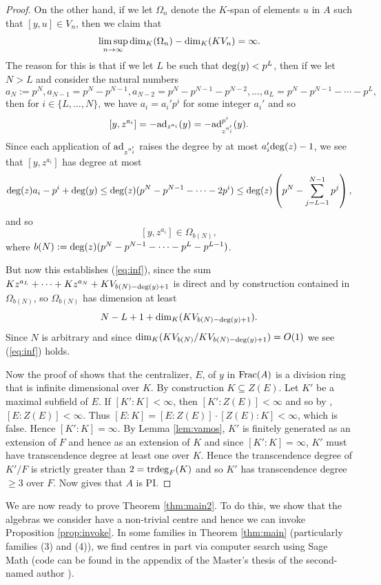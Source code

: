\documentclass[a4paper,11pt,twoside,notitlepage,reqno]{amsart}
\theoremstyle{plain}
\numberwithin{thm}{section}
\theoremstyle{definition}
\begin{document}
\begin{proof}
On the other hand, if we let $\Omega_n$ denote the $K$-span of elements $u$ in $A$ such that $[y,u]\in V_n$, then we claim that 
\begin{equation}
\limsup_{n\to \infty} {\rm dim}_K(\Omega_n) - {\rm dim}_K(KV_n) =\infty.\label{eq:inf}\end{equation}
The reason for this is that if we let $L$ be such that ${\rm deg}(y)<p^L$, then if we let $N>L$ and consider the natural numbers
$$a_N:=p^N, a_{N-1}= p^N-p^{N-1}, a_{N-2} = p^N-p^{N-1}-p^{N-2}, \ldots , a_L=p^N-p^{N-1}-\cdots - p^L,$$ then
for $i\in \{L,\ldots ,N\}$, we have $a_i= a_i' p^i$ for some integer $a_i'$ and so
$$[y,z^{a_i}] = -{\rm ad}_{z^{a_i}}(y) = -{\rm ad}_{z^{a_i'}}^{p^i}(y).$$ Since each application of ${\rm ad}_{z^{a_i'}}$ raises the degree by at most $a_i'{\rm deg}(z)-1$, we see that
 $[y,z^{a_i}]$ has degree at most $${\rm deg}(z) a_i - p^i + {\rm deg}(y) \le {\rm deg}(z)(p^N- p^{N-1}-\cdots - 2p^i) \le {\rm deg}(z)\left(p^N- \sum_{j=L-1}^{N-1} p^j\right),$$
and  so $$[y,z^{a_i}]\in \Omega_{b(N)},$$ where $b(N):={\rm deg}(z)(p^N-p^{N-1}-\cdots -p^L - p^{L-1})$.

But now this establishes (\ref{eq:inf}), since the sum $Kz^{a_L}+\cdots +Kz^{a_N}+ KV_{b(N)-{\rm deg}(y)+1}$ is direct and by construction contained in $\Omega_{b(N)}$, so
$\Omega_{b(N)}$ has dimension at least $$N-L+1+{\rm dim}_K(KV_{b(N)-{\rm deg}(y)+1}).$$  Since $N$ is arbitrary and since ${\rm dim}_K(KV_{b(N)}/KV_{b(N)-{\rm deg}(y)+1})=O(1)$ we see (\ref{eq:inf}) holds.  

Now the proof of \cite[Corollary 1.6]{Bell} shows that the centralizer, $E$, of $y$ in ${\rm Frac}(A)$ is a division ring that is infinite dimensional over $K$.  By construction $K\subseteq Z(E)$.
Let $K'$ be a maximal subfield of $E$. If $[K':K]<\infty$, then $[K':Z(E)]<\infty$ and so by \cite[Theorem 15.4]{Lam}, $[E:Z(E)]<\infty$. Thus $[E:K]=[E:Z(E)]\cdot [Z(E):K]<\infty$, which is false.  Hence
$[K':K]=\infty$. By Lemma \ref{lem:vamos}, $K'$ is finitely generated as an extension of $F$ and hence as an extension of $K$ and since $[K':K]=\infty$, $K'$ must have transcendence degree at least one over $K$. Hence the transcendence degree of $K'/F$ is strictly greater than $2={\rm trdeg}_F(K)$ and so $K'$ has transcendence degree $\ge 3$ over $F$. Now \cite[Theorem 1.1]{Belldiv} gives that $A$ is PI.
\end{proof}
We are now ready to prove Theorem \ref{thm:main2}. To do this, we show that the algebras we consider have a non-trivial centre and hence we can invoke Proposition \ref{prop:invoke}. In some families in Theorem \ref{thm:main} (particularly families (3) and (4)), we find centres in part via computer search using Sage Math (code can be found in the appendix of the Master's thesis of the second-named author \cite{Li}).  
\end{document}
